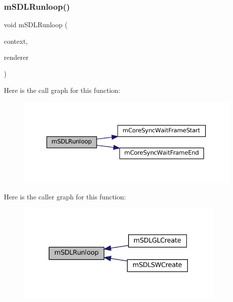 \subsubsection{\texorpdfstring{m\+S\+D\+L\+Runloop()}{mSDLRunloop()}}
{\footnotesize\ttfamily void m\+S\+D\+L\+Runloop (\begin{DoxyParamCaption}\item[{struct G\+B\+A\+Thread $\ast$}]{context,  }\item[{struct S\+D\+L\+Software\+Renderer $\ast$}]{renderer }\end{DoxyParamCaption})\hspace{0.3cm}{\ttfamily [static]}}

Here is the call graph for this function\+:
\nopagebreak
\begin{figure}[H]
\begin{center}
\leavevmode
\includegraphics[width=350pt]{pandora-sdl_8c_a290e757b4ab3c47950e274fdf8d6c7ea_cgraph}
\end{center}
\end{figure}
Here is the caller graph for this function\+:
\nopagebreak
\begin{figure}[H]
\begin{center}
\leavevmode
\includegraphics[width=294pt]{pandora-sdl_8c_a290e757b4ab3c47950e274fdf8d6c7ea_icgraph}
\end{center}
\end{figure}
\mbox{\label{pandora-sdl_8c_a272167ed06db7f73e361c3bfbd158698}} 

